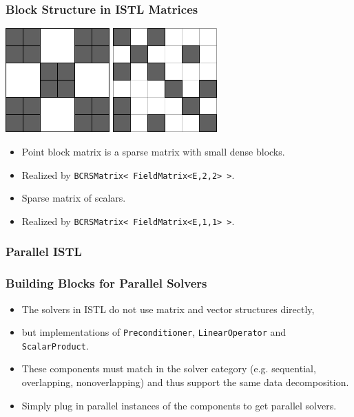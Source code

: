 \begin{frame}[fragile]
\frametitle{Block Structure in ISTL Matrices}
\begin{block}{}
\includegraphics[width=0.3\textwidth]{./EPS/pointblockmatrix}\hfill
\includegraphics[width=0.3\textwidth]{./EPS/scalarmatrix}

\begin{minipage}{0.48\textwidth}
  \begin{itemize}
  \item  Point block matrix is a sparse matrix with small dense
blocks.
\item Realized by \lstinline[basicstyle=\tiny]!BCRSMatrix< FieldMatrix<E,2,2> >!.
  \end{itemize}
\end{minipage}
\begin{minipage}{0.48\textwidth}
  \begin{itemize}
  \item Sparse matrix of scalars.
  \item Realized by \lstinline[basicstyle=\tiny]!BCRSMatrix< FieldMatrix<E,1,1> >!.
  \end{itemize}
\end{minipage}
\end{block}
\end{frame}

\subsubsection{Parallel ISTL}
\begin{frame}
  \frametitle{Building Blocks for Parallel Solvers}

  \begin{itemize}
  \item The solvers in ISTL do not use matrix and vector structures
    directly,
  \item but implementations of \lstinline!Preconditioner!,
    \lstinline!LinearOperator! and \lstinline!ScalarProduct!.
  \item These components must match in the solver category
    (e.g. sequential, overlapping, nonoverlapping) and thus support
    the same data decomposition.
  \item Simply plug in parallel instances of the components to get
    parallel solvers.
  \end{itemize}
\end{frame}

